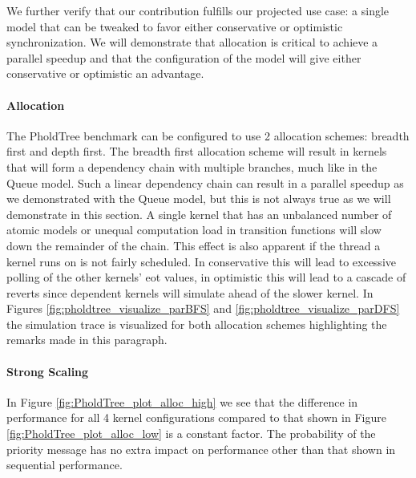 We further verify that our contribution fulfills our projected use case: a single model that can be tweaked to favor either conservative or optimistic synchronization. We will demonstrate that allocation is critical to achieve a parallel speedup and that the configuration of the model will give either conservative or optimistic an advantage.
\paragraph*{Allocation}\label{PholdTreeallocation}
The PholdTree benchmark can be configured to use 2 allocation schemes: breadth first and depth first.
The breadth first allocation scheme will result in kernels that will form a dependency chain with multiple branches, much like in the Queue model.
Such a linear dependency chain can result in a parallel speedup as we demonstrated with the Queue model, but this is not always true as we will demonstrate in this section.
A single kernel that has an unbalanced number of atomic models or unequal computation load in transition functions will slow down the remainder of the chain. This effect is also apparent if the thread a kernel runs on is not fairly scheduled. In conservative this will lead to excessive polling of the other kernels' eot values, in optimistic this will lead to a cascade of reverts since dependent kernels will simulate ahead of the slower kernel. In Figures \ref{fig:pholdtree_visualize_parBFS} and \ref{fig:pholdtree_visualize_parDFS} the simulation trace is visualized for both allocation schemes highlighting the remarks made in this paragraph.
%
%   
%   

\paragraph*{Strong Scaling}\label{pholdtreestrongscale}
In Figure \ref{fig:PholdTree_plot_alloc_high} we see that the difference in performance for all 4 kernel configurations compared to that shown in Figure \ref{fig:PholdTree_plot_alloc_low} is a constant factor. The probability of the priority message has no extra impact on performance other than that shown in sequential performance.

